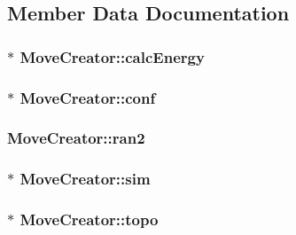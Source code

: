 \subsection{Member Data Documentation}
\hypertarget{class_move_creator_ac60e9b10f19291781e8e3b668044aef9}{
\subsubsection[{calc\+Energy}]{$\ast$ Move\+Creator\+::calc\+Energy}}\label{class_move_creator_ac60e9b10f19291781e8e3b668044aef9}
\hypertarget{class_move_creator_ab8854d02b8ca0b270709909e2ed1fb27}{
\subsubsection[{conf}]{$\ast$ Move\+Creator\+::conf\hspace{0.3cm}{\ttfamily [private]}}}\label{class_move_creator_ab8854d02b8ca0b270709909e2ed1fb27}
\hypertarget{class_move_creator_addcd872d90fcfd53bc0ffd83b1b5a770}{
\subsubsection[{ran2}]{ Move\+Creator\+::ran2}}\label{class_move_creator_addcd872d90fcfd53bc0ffd83b1b5a770}
\hypertarget{class_move_creator_a75cae5ea1a390a8f3dc20e8870576404}{
\subsubsection[{sim}]{$\ast$ Move\+Creator\+::sim\hspace{0.3cm}{\ttfamily [private]}}}\label{class_move_creator_a75cae5ea1a390a8f3dc20e8870576404}
\hypertarget{class_move_creator_a34a03c3300543b9db3f7b03bb77027d3}{
\subsubsection[{topo}]{$\ast$ Move\+Creator\+::topo\hspace{0.3cm}{\ttfamily [private]}}}\label{class_move_creator_a34a03c3300543b9db3f7b03bb77027d3}


